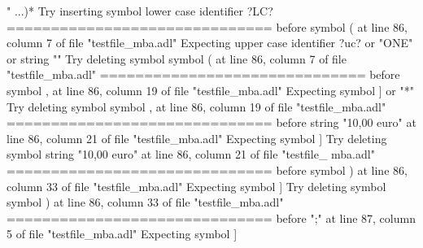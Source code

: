 {  " ...)*\newline
  Try inserting symbol lower case identifier ?LC?\newline
  \newline
  ==============================\newline
  \newline
  before symbol ( at line 86, column 7 of file "testfile\_mba.adl"\newline
  Expecting upper case identifier ?uc? or "ONE" or string ""\newline
  Try deleting symbol symbol ( at line 86, column 7 of file "testfile\_mba.adl"\newline
  \newline
  ==============================\newline
  \newline
  before symbol , at line 86, column 19 of file "testfile\_mba.adl"\newline
  Expecting symbol ] or "*"\newline
  Try deleting symbol symbol , at line 86, column 19 of file "testfile\_mba.adl"\newline
  \newline
  ==============================\newline
  \newline
  before string "10,00 euro" at line 86, column 21 of file "testfile\_mba.adl"\newline
  Expecting symbol ]\newline
  Try deleting symbol string "10,00 euro" at line 86, column 21 of file "testfile\_\newline
  mba.adl"\newline
  \newline
  ==============================\newline
  \newline
  before symbol ) at line 86, column 33 of file "testfile\_mba.adl"\newline
  Expecting symbol ]\newline
  Try deleting symbol symbol ) at line 86, column 33 of file "testfile\_mba.adl"\newline
  \newline
  ==============================\newline
  \newline
  before ";" at line 87, column 5 of file "testfile\_mba.adl"\newline
  Expecting symbol ]\newline
}
